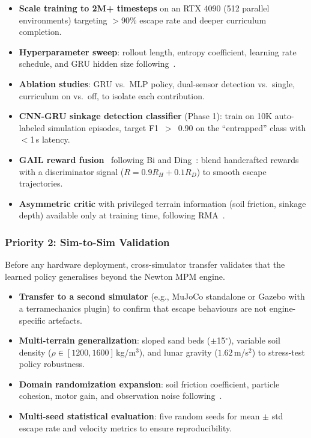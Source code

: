\documentclass[12pt,a4paper]{article}
\begin{document}
\begin{itemize}
    \item \textbf{Scale training to 2M+ timesteps} on an RTX 4090 (512 parallel environments) targeting $>$90\% escape rate and deeper curriculum completion.
    \item \textbf{Hyperparameter sweep}: rollout length, entropy coefficient, learning rate schedule, and GRU hidden size following~\cite{schulman2015gae}.
    \item \textbf{Ablation studies}: GRU vs.\ MLP policy, dual-sensor detection vs.\ single, curriculum on vs.\ off, to isolate each contribution.
    \item \textbf{CNN-GRU sinkage detection classifier} (Phase 1): train on 10K auto-labeled simulation episodes, target F1~$>$~0.90 on the ``entrapped'' class with $<$1\,s latency.
    \item \textbf{GAIL reward fusion}~\cite{ho2016gail} following Bi and Ding~\cite{bi2026escape}: blend handcrafted rewards with a discriminator signal ($R = 0.9R_H + 0.1R_D$) to smooth escape trajectories.
    \item \textbf{Asymmetric critic} with privileged terrain information (soil friction, sinkage depth) available only at training time, following RMA~\cite{kumar2021rma}.
\end{itemize}

\subsubsection{Priority 2: Sim-to-Sim Validation}

Before any hardware deployment, cross-simulator transfer validates that the learned policy generalises beyond the Newton MPM engine.

\begin{itemize}
    \item \textbf{Transfer to a second simulator} (e.g., MuJoCo standalone or Gazebo with a terramechanics plugin) to confirm that escape behaviours are not engine-specific artefacts.
    \item \textbf{Multi-terrain generalization}: sloped sand beds ($\pm$15$^\circ$), variable soil density ($\rho \in [1200, 1600]$\,kg/m$^3$), and lunar gravity ($1.62$\,m/s$^2$) to stress-test policy robustness.
    \item \textbf{Domain randomization expansion}: soil friction coefficient, particle cohesion, motor gain, and observation noise following~\cite{tobin2017domainrand,andrychowicz2020learning}.
    \item \textbf{Multi-seed statistical evaluation}: five random seeds for mean $\pm$ std escape rate and velocity metrics to ensure reproducibility.
\end{itemize}
\end{document}
